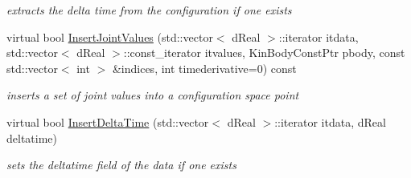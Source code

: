 \begin{DoxyCompactItemize}
\begin{DoxyCompactList}\small\item\em extracts the delta time from the configuration if one exists \item\end{DoxyCompactList}\item 
virtual bool \hyperlink{classOpenRAVE_1_1ConfigurationSpecification_a9c074a4751be2ad6464d90a58bc316fd}{InsertJointValues} (std::vector$<$ dReal $>$::iterator itdata, std::vector$<$ dReal $>$::const\_\-iterator itvalues, KinBodyConstPtr pbody, const std::vector$<$ int $>$ \&indices, int timederivative=0) const 
\begin{DoxyCompactList}\small\item\em inserts a set of joint values into a configuration space point \item\end{DoxyCompactList}\item 
virtual bool \hyperlink{classOpenRAVE_1_1ConfigurationSpecification_acc28b13daf14ef9cba5a7baedea7eb46}{InsertDeltaTime} (std::vector$<$ dReal $>$::iterator itdata, dReal deltatime)
\begin{DoxyCompactList}\small\item\em sets the deltatime field of the data if one exists \item\end{DoxyCompactList}\end{DoxyCompactItemize}
